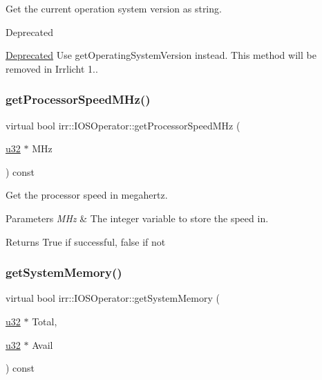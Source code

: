 Get the current operation system version as string. 

\begin{DoxyRefDesc}{Deprecated}
\item[\hyperlink{deprecated__deprecated000016}{Deprecated}]Use get\+Operating\+System\+Version instead. This method will be removed in Irrlicht 1.. \end{DoxyRefDesc}
\mbox{\label{classirr_1_1IOSOperator_abc61b8016ec35125ef94adea42209ecd}} 
\subsubsection{\texorpdfstring{get\+Processor\+Speed\+M\+Hz()}{getProcessorSpeedMHz()}}
{\footnotesize\ttfamily virtual bool irr\+::\+I\+O\+S\+Operator\+::get\+Processor\+Speed\+M\+Hz (\begin{DoxyParamCaption}\item[{\hyperlink{namespaceirr_a0416a53257075833e7002efd0a18e804}{u32} $\ast$}]{M\+Hz }\end{DoxyParamCaption}) const\hspace{0.3cm}{\ttfamily [pure virtual]}}



Get the processor speed in megahertz. 


\begin{DoxyParams}{Parameters}
{\em M\+Hz} & The integer variable to store the speed in. \\
\hline
\end{DoxyParams}
\begin{DoxyReturn}{Returns}
True if successful, false if not 
\end{DoxyReturn}
\mbox{\label{classirr_1_1IOSOperator_af58b50cecf28f247e1f302ee0b9e8270}} 
\subsubsection{\texorpdfstring{get\+System\+Memory()}{getSystemMemory()}}
{\footnotesize\ttfamily virtual bool irr\+::\+I\+O\+S\+Operator\+::get\+System\+Memory (\begin{DoxyParamCaption}\item[{\hyperlink{namespaceirr_a0416a53257075833e7002efd0a18e804}{u32} $\ast$}]{Total,  }\item[{\hyperlink{namespaceirr_a0416a53257075833e7002efd0a18e804}{u32} $\ast$}]{Avail }\end{DoxyParamCaption}) const\hspace{0.3cm}{\ttfamily [pure virtual]}}



